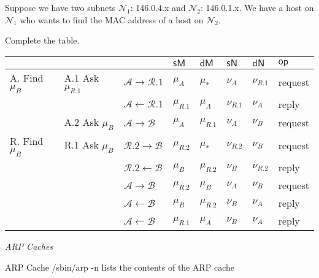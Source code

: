 \begin{example}
Suppose we have two subnets $\mathcal{N}_1$: 146.0.4.x and $\mathcal{N}_2$: 146.0.1.x. 
We have a host on $\mathcal{N}_1$ who wants to find the MAC address of a host 
on $\mathcal{N}_2$. 

Complete the table.
\begin{table}[h]
    \centering
    \begin{tabular}{ll|llllll}
    & &    & $\textsf{sM}$ & $\textsf{dM}$  & $\textsf{sN}$ & $\textsf{dN}$ & $\textsf{op}$ \\ \hline
    A. Find $\mu_B$& A.1 Ask $\mu_{R.1}$ & $\mathcal{A} \rightarrow \mathcal{R}.1$  & $\mu_{A}$ & $ \mu_{*} $ & $\nu_{A}$ & $\nu_{R.1}$ & \textsf{request}  \\
    & & $\mathcal{A} \leftarrow \mathcal{R}.1$   & $\mu_{R.1}$ & $\mu_{A}$ & $\nu_{R.1}$ & $\nu_{A}$ & \textsf{reply} \\ 
    & A.2 Ask $\mu_B$ & $\mathcal{A} \rightarrow \mathcal{B}$   & $\mu_{A}$ & $\mu_{R.1}$ & $\nu_{A}$ & $\nu_{B}$ & \textsf{request}  \\ \hline
    R. Find $\mu_B$ & R.1 Ask $\mu_B$ & $\mathcal{R}.2 \rightarrow \mathcal{B}$   & $\mu_{R.2}$ & $\mu_{*}$ & $\nu_{R.2}$ & $\nu_{B}$ & \textsf{request}  \\
    & & $\mathcal{R}.2 \leftarrow \mathcal{B}$   & $\mu_{B}$ & $\mu_{R.2}$ & $\nu_{B}$ & $\nu_{R.2}$ & \textsf{reply}  \\ \hline
    &  & $\mathcal{A} \rightarrow \mathcal{B}$   & $\mu_{R.2}$ & $\mu_{B}$ & $\nu_{A}$ & $\nu_{B}$ & \textsf{request}  \\ 
    &  & $\mathcal{A} \leftarrow \mathcal{B}$   & $\mu_{B}$ & $\mu_{R.2}$ & $\nu_{B}$ & $\nu_{A}$ & \textsf{reply}  \\
    &  & $\mathcal{A} \leftarrow \mathcal{B}$   & $\mu_{R.1}$ & $\mu_{A}$ & $\nu_{B}$ & $\nu_{A}$ & \textsf{reply}  \\
    \end{tabular}
\end{table}



\end{example}




\frmrule 

\textit{ARP Caches}


\begin{sidenote}{ARP Cache}
/sbin/arp -n lists the contents of the ARP cache\\
\end{sidenote}


